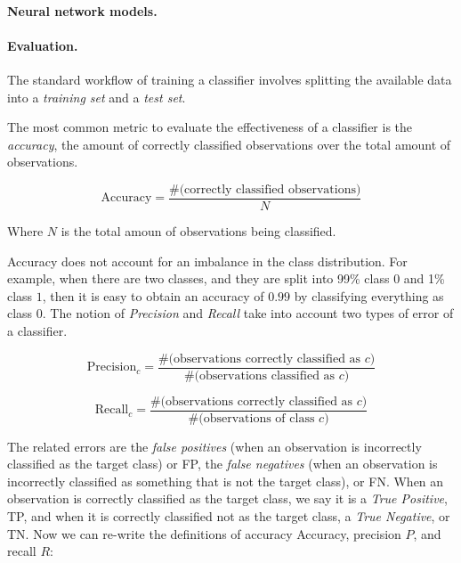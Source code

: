 \paragraph{Neural network models.} 


\paragraph{Evaluation.}

The standard workflow of training a classifier involves splitting the available
data into a {\em training set} and a {\em test set}. 
%

The most common metric to evaluate the effectiveness of a classifier is the {\em
accuracy}, the amount of correctly classified observations over the total amount of
observations.

\begin{equation}
    \text{Accuracy} = \frac{\text{\#(correctly\ classified\ observations)}}{N}
\end{equation}

Where $N$ is the total amoun of observations being classified.

Accuracy does not account for an imbalance in the class distribution.
%
For example, when there are two classes, and they are split into 99\% class $0$
and 1\% class $1$, then it is easy to obtain an accuracy of $0.99$ by
classifying everything as class $0$.
%
The notion of {\em Precision} and {\em Recall} take into account two types of
error of a classifier.

\begin{equation}
    \text{Precision}_c = \frac{\text{\#(observations\ correctly\ classified\ as\ } c \text{)}}{ \text{\#(observations\ classified\ as\ } c \text{)} }
\end{equation}

\begin{equation}
    \text{Recall}_c = \frac{\text{\#(observations\ correctly\ classified\ as\ } c \text{)}}{ \text{\#(observations\ of\ class\ } c\text{)} } 
\end{equation}

The related errors are the {\em false positives} (when an observation is
incorrectly classified as the target class) or FP, the {\em false negatives}
(when an observation is incorrectly classified as something that is not the
target class), or FN. 
%
When an observation is correctly classified as the target class, we say it is a
{\em True Positive}, TP, and when it is correctly classified not as the target
class, a {\em True Negative}, or TN.
%
Now we can re-write the definitions of accuracy Accuracy, precision $P$, and recall
$R$:

